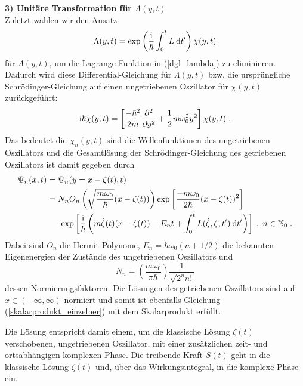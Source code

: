      \textbf{3) Unitäre Transformation für $\Lambda(y,t)$}\\
      Zuletzt wählen wir den Ansatz
      \begin{equation}
        \Lambda(y,t) = \exp\left(\frac{\text i}{\hbar}\int_0^tL \: \text d t'\right)\chi(y,t)
      \end{equation}
      für $\Lambda(y,t)$, um die Lagrange-Funktion in (\ref{dgl_lambda}) zu eliminieren.
      Dadurch wird diese Differential-Gleichung für $\Lambda(y,t)$ bzw. die ursprüngliche Schrödinger-Gleichung auf einen ungetriebenen Oszillator für $\chi(y,t)$ zurückgeführt:
      \begin{equation}
        \text i \hbar \dot \chi(y,t) = \left[ \frac{-\hbar^2}{2m}\frac{\partial^2}{\partial y^2} + \frac{1}{2}m\omega_0^2y^2 \right]\chi(y,t) \; .
      \end{equation}
      Das bedeutet die $\chi_n(y,t)$ sind die Wellenfunktionen des ungetriebenen Oszillators und die Gesamtlösung der Schrödinger-Gleichung des getriebenen Oszillators ist damit gegeben durch
      \begin{align}
        \begin{split}
        \Psi_n(x,t) &= \Psi_n(y=x-\zeta(t),t) \\
        &= N_nO_n\left(\sqrt{\frac{m\omega_0}{\hbar}}(x-\zeta(t))\right) \exp\left[\frac{-m\omega_0}{2\hbar}(x-\zeta(t))^2\right] \\
        &\quad \cdot \exp\left[\frac{\text i}{\hbar}\left(m\dot \zeta(t)(x-\zeta(t))-E_nt+\int_0^tL(\dot \zeta,\zeta,t')\:\text dt'\right)\right] \; ,
        \; n \in \mathbb{N}_0 \; .
        \label{gesamtlsg_einzelner}
      \end{split}
      \end{align}
      Dabei sind $O_n$ die Hermit-Polynome, $E_n = \hbar \omega_0(n+1/2)$ die bekannten Eigenenergien der Zustände des ungetriebenen Oszillators und
      \begin{equation}
        N_n = \left(\frac{m\omega_0}{\pi \hbar}\right) \frac{1}{\sqrt{2^nn!}}
      \end{equation}
      dessen Normierungsfaktoren.
      Die Lösungen des getriebenen Oszillators sind auf $x \in (-\infty, \infty)$ normiert und somit ist ebenfalls Gleichung (\ref{skalarprodukt_einzelner}) mit dem Skalarprodukt erfüllt.

      Die Lösung entspricht damit einem, um die klassische Lösung $\zeta(t)$ verschobenen, ungetriebenen Oszillator, mit einer zusätzlichen zeit- und ortsabhängigen komplexen Phase.
      Die treibende Kraft $S(t)$ geht in die klassische Lösung $\zeta(t)$ und, über das Wirkungsintegral, in die komplexe Phase ein.



